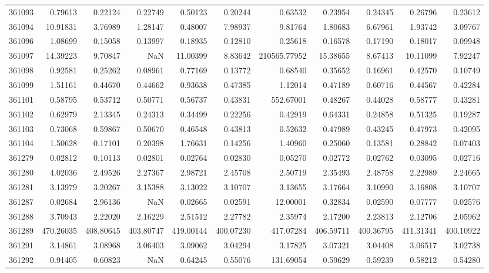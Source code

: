 \begin{tabular}{lrrrrrrrrrr}
361093 & 0.79613 & 0.22124 & 0.22749 & 0.50123 & 0.20244 & 0.63532 & 0.23954 & 0.24345 & 0.26796 & 0.23612 \\
361094 & 10.91831 & 3.76989 & 1.28147 & 0.48007 & 7.98937 & 9.81764 & 1.80683 & 6.67961 & 1.93742 & 3.09767 \\
361096 & 1.08699 & 0.15058 & 0.13997 & 0.18935 & 0.12810 & 0.25618 & 0.16578 & 0.17190 & 0.18017 & 0.09948 \\
361097 & 14.39223 & 9.70847 & NaN & 11.00399 & 8.83642 & 210565.77952 & 15.38655 & 8.67413 & 10.11099 & 7.92247 \\
361098 & 0.92581 & 0.25262 & 0.08961 & 0.77169 & 0.13772 & 0.68540 & 0.35652 & 0.16961 & 0.42570 & 0.10749 \\
361099 & 1.51161 & 0.44670 & 0.44662 & 0.93638 & 0.47385 & 1.12014 & 0.47189 & 0.60716 & 0.44567 & 0.42284 \\
361101 & 0.58795 & 0.53712 & 0.50771 & 0.56737 & 0.43831 & 552.67001 & 0.48267 & 0.44028 & 0.58777 & 0.43281 \\
361102 & 0.62979 & 2.13345 & 0.24313 & 0.34499 & 0.22256 & 0.42919 & 0.64331 & 0.24858 & 0.51325 & 0.19287 \\
361103 & 0.73068 & 0.59867 & 0.50670 & 0.46548 & 0.43813 & 0.52632 & 0.47989 & 0.43245 & 0.47973 & 0.42095 \\
361104 & 1.50628 & 0.17101 & 0.20398 & 1.76631 & 0.14256 & 1.40960 & 0.25060 & 0.13581 & 0.28842 & 0.07403 \\
361279 & 0.02812 & 0.10113 & 0.02801 & 0.02764 & 0.02830 & 0.05270 & 0.02772 & 0.02762 & 0.03095 & 0.02716 \\
361280 & 4.02036 & 2.49526 & 2.27367 & 2.98721 & 2.45708 & 2.50719 & 2.35493 & 2.48758 & 2.22989 & 2.24665 \\
361281 & 3.13979 & 3.20267 & 3.15388 & 3.13022 & 3.10707 & 3.13655 & 3.17664 & 3.10990 & 3.16808 & 3.10707 \\
361287 & 0.02684 & 2.96136 & NaN & 0.02665 & 0.02591 & 12.00001 & 0.32834 & 0.02590 & 0.07777 & 0.02576 \\
361288 & 3.70943 & 2.22020 & 2.16229 & 2.51512 & 2.27782 & 2.35974 & 2.17200 & 2.23813 & 2.12706 & 2.05962 \\
361289 & 470.26035 & 408.80645 & 403.80747 & 419.00144 & 400.07230 & 417.07284 & 406.59711 & 400.36795 & 411.31341 & 400.10922 \\
361291 & 3.14861 & 3.08968 & 3.06403 & 3.09062 & 3.04294 & 3.17825 & 3.07321 & 3.04408 & 3.06517 & 3.02738 \\
361292 & 0.91405 & 0.60823 & NaN & 0.64245 & 0.55076 & 131.69054 & 0.59629 & 0.59239 & 0.58212 & 0.54280 \\

\end{tabular}
